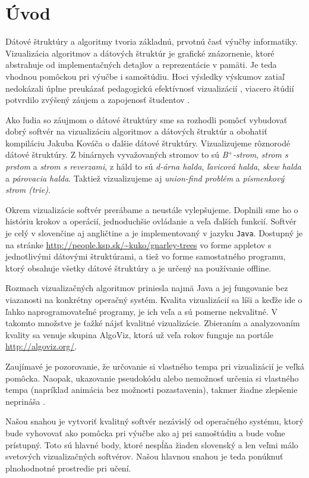 \section{Úvod}
Dátové štruktúry a algoritmy tvoria základnú, prvotnú časť výučby 
informatiky. Vizualizácia algoritmov a dátových štruktúr je grafické 
znázornenie, ktoré abstrahuje od implementačných detajlov a reprezentácie
v pamäti. Je teda vhodnou pomôckou pri výučbe i samoštúdiu. Hoci výsledky
výskumov zatiaľ nedokázali úplne preukázať pedagogickú efektívnosť
vizualizácií \citep{shaffer}, viacero štúdií potvrdilo zvýšený záujem
a zapojenosť študentov \citep{naps02, hundhausen02}.

Ako ľudia so záujmom o dátové štruktúry sme sa rozhodli pomôcť vybudovať 
dobrý softvér na vizualizáciu algoritmov a dátových štruktúr a obohatiť 
kompiláciu Jakuba Kováča \citep{kuko} o ďalšie dátové štruktúry. 
Vizualizujeme rôznorodé dátové štruktúry. Z binárnych vyvažovaných stromov 
to sú \emph{B$^+$-strom}, \emph{strom s prstom} a \emph{strom s reverzami}, z háld to sú \emph{d-árna 
halda}, \emph{ľavicová halda}, \emph{skew halda} a \emph{párovacia halda}. 
Taktiež vizualizujeme aj \emph{union-find problém} a 
\emph{písmenkový strom (trie)}. 

Okrem vizualizácie softvér prerábame a neustále vylepšujeme.
Doplnili sme ho o históriu krokov a operácií, jednoduchšie ovládanie
a veľa ďalších funkcií. Softvér je celý v slovenčine aj angličtine a je 
implementovaný v jazyku \texttt{Java}. Dostupný je na stránke
\hbox{\url{http://people.ksp.sk/~kuko/gnarley-trees}} vo forme appletov
s jednotlivými dátovými štruktúrami, a tiež vo forme samostatného programu,
ktorý obsahuje všetky dátové štruktúry a je určený na používanie offline.

Rozmach vizualizačných algoritmov priniesla najmä Java a jej fungovanie 
bez viazanosti na konkrétny operačný systém. Kvalita vizualizácií sa líši 
a keďže ide o ľahko naprogramovateľné programy, je ich veľa a sú pomerne 
nekvalitné. V takomto množstve je ťažké nájsť kvalitné vizualizácie. 
Zbieraním a analyzovaním kvality sa venuje skupina AlgoViz, ktorá už 
veľa rokov funguje na portále \url{http://algoviz.org/}.

Zaujímavé je pozorovanie, že určovanie si vlastného tempa pri vizualizácií 
je veľká pomôcka. Naopak, ukazovanie pseudokódu alebo nemožnosť určenia si
vlastného tempa (napríklad animácia bez možnosti pozastavenia), takmer 
žiadne zlepšenie neprináša \citep{shaffer,saraiya}.

Našou snahou je vytvoriť kvalitný softvér nezávislý od operačného systému, 
ktorý bude vyhovovať ako pomôcka pri výučbe ako aj pri samoštúdiu a bude
voľne prístupný. Toto sú hlavné body, ktoré nespĺňa žiaden slovenský a 
len veľmi málo svetových vizualizačných softvérov. Našou hlavnou snahou 
je teda ponúknuť plnohodnotné prostredie pri učení.